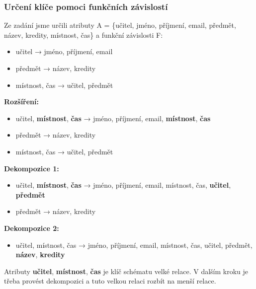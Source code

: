 \subsubsection{Určení klíče pomoci funkčních závislostí}
Ze zadání jsme určili atributy A = \{učitel, jméno, příjmení, email, předmět, název, kredity, místnost, čas\} a funkční závislosti F:
\begin{itemize}
	\item učitel → jméno, příjmení, email
	\item předmět → název, kredity
	\item místnost, čas → učitel, předmět
\end{itemize}

\noindent\textbf{Rozšíření:}
\begin{itemize}
\item učitel, \textbf{místnost}, \textbf{čas} → jméno, příjmení, email, \textbf{místnost}, \textbf{čas}
\item předmět → název, kredity
\item místnost, čas → učitel, předmět
\end{itemize}

\noindent\textbf{Dekompozice 1:}
\begin{itemize}
\item učitel, \textbf{místnost}, \textbf{čas} → jméno, příjmení, email, místnost, čas, \textbf{učitel}, \textbf{předmět}
\item předmět → název, kredity
\end{itemize}

\noindent\textbf{Dekompozice 2:}
\begin{itemize}
\item učitel, místnost, čas → jméno, příjmení, email, místnost, čas, učitel, předmět, \textbf{název}, \textbf{kredity}
\end{itemize}

Atributy \textbf{učitel}, \textbf{místnost}, \textbf{čas} je klíč schématu velké relace. V dalším kroku je třeba provést dekompozici a tuto velkou relaci rozbít na menší relace.


